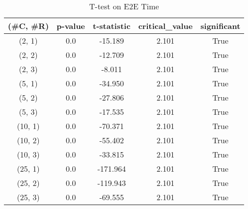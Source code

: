 \begin{table}
\centering
\caption{T-test on E2E Time}
\label{tab:t-testExperiment}
\begin{tabular}{|c|c|c|c|c|}
\toprule
(\#C, \#R) &  p-value &  t-statistic &  critical\_value &  significant \\
\midrule
  (2, 1) &      0.0 &      -15.189 &           2.101 &         True \\
  (2, 2) &      0.0 &      -12.709 &           2.101 &         True \\
  (2, 3) &      0.0 &       -8.011 &           2.101 &         True \\
  (5, 1) &      0.0 &      -34.950 &           2.101 &         True \\
  (5, 2) &      0.0 &      -27.806 &           2.101 &         True \\
  (5, 3) &      0.0 &      -17.535 &           2.101 &         True \\
 (10, 1) &      0.0 &      -70.371 &           2.101 &         True \\
 (10, 2) &      0.0 &      -55.402 &           2.101 &         True \\
 (10, 3) &      0.0 &      -33.815 &           2.101 &         True \\
 (25, 1) &      0.0 &     -171.964 &           2.101 &         True \\
 (25, 2) &      0.0 &     -119.943 &           2.101 &         True \\
 (25, 3) &      0.0 &      -69.555 &           2.101 &         True \\
\bottomrule
\end{tabular}
\end{table}
